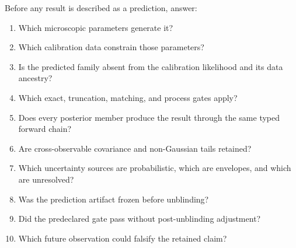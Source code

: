 \documentclass[11pt]{article}
\begin{document}
Before any result is described as a prediction, answer:
\begin{enumerate}
\item Which microscopic parameters generate it?
\item Which calibration data constrain those parameters?
\item Is the predicted family absent from the calibration likelihood and its
data ancestry?
\item Which exact, truncation, matching, and process gates apply?
\item Does every posterior member produce the result through the same typed
forward chain?
\item Are cross-observable covariance and non-Gaussian tails retained?
\item Which uncertainty sources are probabilistic, which are envelopes, and
which are unresolved?
\item Was the prediction artifact frozen before unblinding?
\item Did the predeclared gate pass without post-unblinding adjustment?
\item Which future observation could falsify the retained claim?
\end{enumerate}
\end{document}
